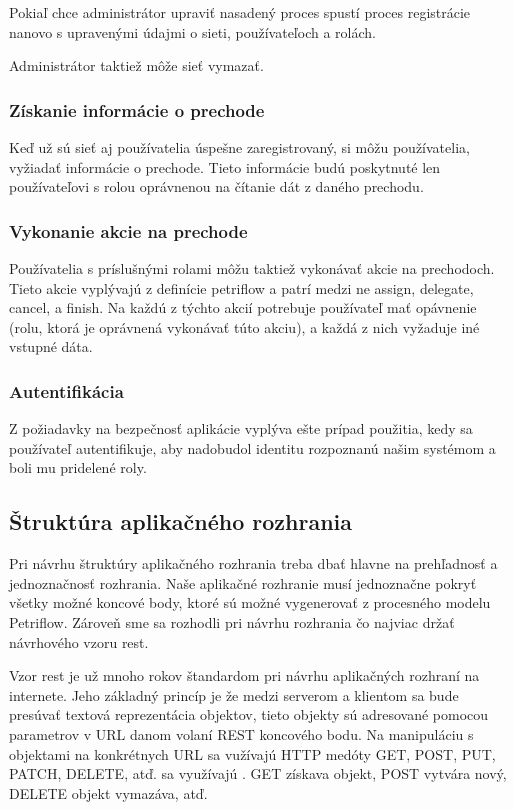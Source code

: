 Pokiaľ chce administrátor upraviť nasadený proces spustí proces registrácie nanovo s upravenými údajmi o sieti, používateľoch a rolách.

Administrátor taktiež môže sieť vymazať.

\subsubsection{Získanie informácie o prechode}
Keď už sú sieť aj používatelia úspešne zaregistrovaný, si môžu používatelia, vyžiadať informácie o prechode. Tieto informácie budú poskytnuté len používateľovi s rolou oprávnenou na čítanie dát z daného prechodu.

\subsubsection{Vykonanie akcie na prechode}
Používatelia s príslušnými rolami môžu taktiež vykonávať akcie na prechodoch. Tieto akcie vyplývajú z definície petriflow a patrí medzi ne assign, delegate, cancel, a finish. Na každú z týchto akcií potrebuje používateľ mať opávnenie (rolu, ktorá je oprávnená vykonávať túto akciu), a každá z nich vyžaduje iné vstupné dáta.

\subsubsection{Autentifikácia}
Z požiadavky na bezpečnosť aplikácie vyplýva ešte prípad použitia, kedy sa používateľ autentifikuje, aby nadobudol identitu rozpoznanú našim systémom a boli mu pridelené roly.

\subsection{Štruktúra aplikačného rozhrania}
Pri návrhu štruktúry aplikačného rozhrania treba dbať hlavne na prehľadnosť a jednoznačnosť rozhrania. Naše aplikačné rozhranie musí jednoznačne pokryť všetky možné koncové body, ktoré sú možné vygenerovať z procesného modelu Petriflow. Zároveň sme sa rozhodli pri návrhu rozhrania čo najviac držať návrhového vzoru \acrshort{rest}. 

Vzor \acrshort{rest} je už mnoho rokov štandardom pri návrhu aplikačných rozhraní na internete. Jeho základný princíp je že medzi serverom a klientom sa bude presúvať textová reprezentácia objektov, tieto objekty sú adresované pomocou parametrov v URL danom volaní REST koncového bodu. Na manipuláciu s objektami na konkrétnych URL sa vužívajú HTTP medóty GET, POST, PUT, PATCH, DELETE, atď.  sa využívajú . GET získava objekt, POST vytvára nový, DELETE objekt vymazáva, atď.

